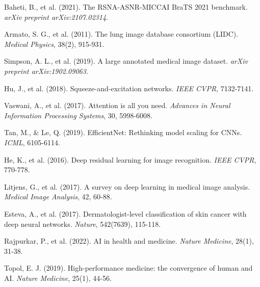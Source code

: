 \documentclass[12pt,a4paper]{article}
\begin{document}
\begin{thebibliography}{99}
Baheti, B., et al. (2021). The RSNA-ASNR-MICCAI BraTS 2021 benchmark. \textit{arXiv preprint arXiv:2107.02314}.

Armato, S. G., et al. (2011). The lung image database consortium (LIDC). \textit{Medical Physics}, 38(2), 915-931.

Simpson, A. L., et al. (2019). A large annotated medical image dataset. \textit{arXiv preprint arXiv:1902.09063}.

Hu, J., et al. (2018). Squeeze-and-excitation networks. \textit{IEEE CVPR}, 7132-7141.

Vaswani, A., et al. (2017). Attention is all you need. \textit{Advances in Neural Information Processing Systems}, 30, 5998-6008.

Tan, M., \& Le, Q. (2019). EfficientNet: Rethinking model scaling for CNNs. \textit{ICML}, 6105-6114.

He, K., et al. (2016). Deep residual learning for image recognition. \textit{IEEE CVPR}, 770-778.

Litjens, G., et al. (2017). A survey on deep learning in medical image analysis. \textit{Medical Image Analysis}, 42, 60-88.

Esteva, A., et al. (2017). Dermatologist-level classification of skin cancer with deep neural networks. \textit{Nature}, 542(7639), 115-118.

Rajpurkar, P., et al. (2022). AI in health and medicine. \textit{Nature Medicine}, 28(1), 31-38.

Topol, E. J. (2019). High-performance medicine: the convergence of human and AI. \textit{Nature Medicine}, 25(1), 44-56.

\end{thebibliography}
\end{document}
